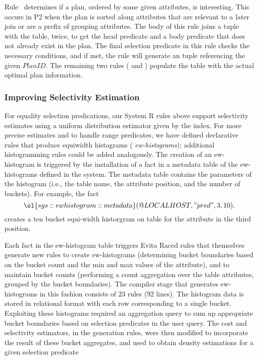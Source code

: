 Rule~ determines if a plan, ordered by some given attributes, is
interesting.  This occurs in P2 when the plan is sorted along attributes that
are relevant to a later join or are a prefix of grouping attributes.  The
body of this rule joins a  tuple with the  table, twice,
to get the head predicate and a body predicate that does not already exist in
the plan.  The final selection predicate in this rule checks the necessary
conditions, and if met, the rule will generate an  tuple
referencing the given $PlanID$.  The remaining two rules ( and
) populate the  table with the actual optimal plan
information.

\subsubsection{Improving Selectivity Estimation}

For equality selection predications, our System R rules above support
selectivity estimates using a uniform distribution estimator given by the
index.  For more precise estimates and to handle range predicates, we have
defined declarative rules that produce equiwidth histograms ({\em
ew-histograms}); additional histogramming rules could be added analogously.
The creation of an ew-histogram is triggered by the installation of a fact in a
metadata table of the ew-histograms defined in the system.  The metadata table
contains the parameters of the histogram (i.e., the table name, the attribute
position, and the number of buckets).  For example, the fact \[
\ol{sys::ewhistogram::metadata}(@LOCALHOST, "pred", 3, 10).  \] creates a ten
bucket equi-width historgram on table  for the attribute in the third
position.

Each fact in the ew-histogram table triggers Evita Raced rules that themselves
generate new rules to create ew-histograms (determining bucket boundaries based
on the bucket count and the min and max values of the attribute), and to
maintain bucket counts (performing a count aggregation over the table
attributes, grouped by the bucket boundaries).  The compiler stage that
generates ew-histograms in this fashion consists of $23$ rules ($92$ lines).
The histogram data is stored in relational format with each row corresponding
to a single bucket.  Exploiting these histograms required an aggregation query
to sum up appropriate bucket boundaries based on selection predicates
in the user query.  The cost and selectivity estimators, in the 
generation rules, were then modified to incorporate the result of these bucket
aggregates, and used to obtain density estimations for a given selection
predicate

